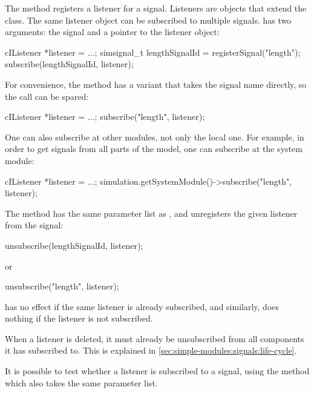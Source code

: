 The  method registers a listener for a signal.
Listeners are objects that extend the  class.
The same listener object can be subscribed to multiple signals.
 has two arguments: the signal and a pointer to
the listener object:

\begin{cpp}
cIListener *listener = ...;
simsignal_t lengthSignalId = registerSignal("length");
subscribe(lengthSignalId, listener);
\end{cpp}

For convenience, the  method has a variant
that takes the signal name directly, so the 
call can be spared:

\begin{cpp}
cIListener *listener = ...;
subscribe("length", listener);
\end{cpp}

One can also subscribe at other modules, not only the local one.
For example, in order to get signals from all parts of the model,
one can subscribe at the system module:

\begin{cpp}
cIListener *listener = ...;
simulation.getSystemModule()->subscribe("length", listener);
\end{cpp}

The  method has the same parameter list
as , and unregisters the given listener
from the signal:

\begin{cpp}
unsubscribe(lengthSignalId, listener);
\end{cpp}

or

\begin{cpp}
unsubscribe("length", listener);
\end{cpp}

 has no effect if the same listener is already
subscribed, and similarly,  does nothing
if the listener is not subscribed.

\begin{note}
  When a listener is deleted, it must already be unsubscribed from
  all components it has subscribed to. This is explained in
  \ref{sec:simple-modules:signals:life-cycle}.
\end{note}

It is possible to test whether a listener is subscribed to a signal,
using the  method which also takes the same
parameter list.

